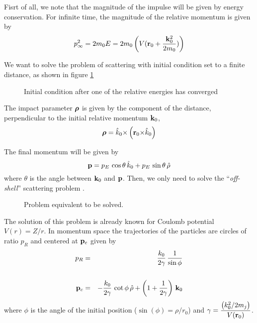 Fisrt of all, we note that the magnitude of the impulse will be given by energy conservation. For infinite time, the magnitude of the relative momentum is given by
\begin{equation}
  \label{Q:ctmc_magnitude}
p_{\infty}^{2}= 2 m_{0} E = 2 m_{0} \left(V(\mathbf{r}_{0} + \frac{\mathbf{k}^{2}_{0}}{2 m_{0}})  \right)
\end{equation}

We want to solve the problem of scattering with initial condition set
to a finite distance, as shown in figure \ref{f:cond-in}

\begin{figure}[h]\label{f:cond-in}
\centering
\caption{Initial condition after one of the relative energies has
converged}
\end{figure}


The impact parameter $\boldsymbol{\rho}$ is given by the component of the distance,
perpendicular to the initial relative momentum $\mathbf{k}_{0}$,
\begin{equation}\label{Q:rho}
\boldsymbol{\rho} = \hat{k}_{0} {\times} \left( \mathbf{r}_{0} {\times} \hat{k}_{0} \right)
\end{equation}

The final momentum will be given by
\begin{equation}\label{Q:finalmom}
\mathbf{p} = p_{E} \, \cos{\theta} \, \hat{k}_{0}+ p_{E}\, \sin{\theta}\,
\hat{\rho}
\end{equation}
%
where $\theta $ is the angle between $\mathbf{k}_{0}$ and $\mathbf{p}$. Then,
we only need to solve the ``\textit{off-shell}'' scattering problem
\cite{Fiol2000JPBp2847}.

\begin{figure}[!htpb]
  \centering
  \caption{Problem equivalent to be solved.
  \label{f:ctmc1}}
\end{figure}


The solution of this problem is already known for Coulomb potential
$V(r) = Z/r$. In momentum space the trajectories of the particles are
circles of ratio $p_{R}$ and centered at $\mathbf{p}_{c}$ given by
\begin{eqnarray}\label{Q:circle-mom}
p_{R} &=& \frac{k_{0}}{2 \gamma} \, \frac{1}{\sin{\phi}} \nonumber \\
\\
\mathbf{p}_{c} &=& - \frac{k_{0}}{2 \gamma } \, \cot{\phi}\, \hat{\rho} +
\left( 1 + \frac{1}{2 \gamma} \right) \, \mathbf{k}_{0} \nonumber
\end{eqnarray}
where $\phi$ is the angle of the initial position ($\sin(\phi) =
\rho/r_{0}$) and $\displaystyle{\gamma = \frac{\left( k_{0}^{2}/2 m_{j}
\right)}{V(\mathbf{r}_{0})}}$.

